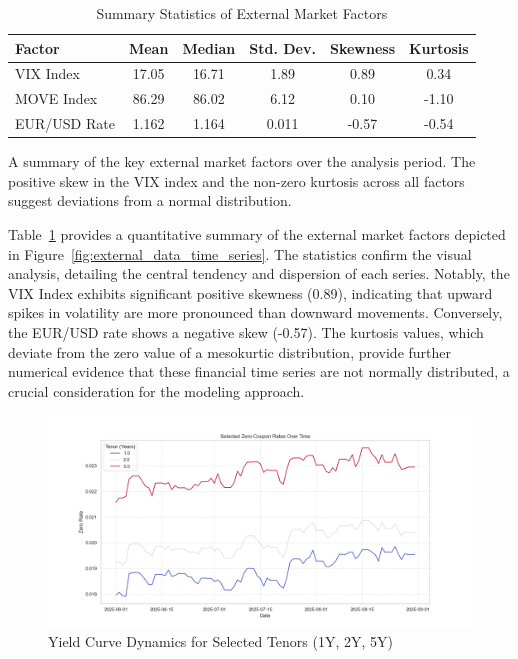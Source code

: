 \begin{table}[H]
	\centering
	\begin{threeparttable}
		\caption{Summary Statistics of External Market Factors}
		\label{tab:external_summary}
		\begin{tabular}{lccccc}
			\toprule
			\textbf{Factor} & \textbf{Mean} & \textbf{Median} & \textbf{Std. Dev.} & \textbf{Skewness} & \textbf{Kurtosis} \\
			\midrule
			VIX Index       & 17.05         & 16.71           & 1.89               & 0.89              & 0.34              \\
			MOVE Index      & 86.29         & 86.02           & 6.12               & 0.10              & -1.10             \\
			EUR/USD Rate    & 1.162         & 1.164           & 0.011              & -0.57             & -0.54             \\
			\bottomrule
		\end{tabular}
		\begin{tablenotes}
			\footnotesize
			\item  A summary of the key external market factors over the analysis period. The positive skew in the VIX index and the non-zero kurtosis across all factors suggest deviations from a normal distribution.
		\end{tablenotes}
	\end{threeparttable}
\end{table}


Table~\ref{tab:external_summary} provides a quantitative summary of the external market factors depicted in Figure~\ref{fig:external_data_time_series}. The statistics confirm the visual analysis, detailing the central tendency and dispersion of each series. Notably, the VIX Index exhibits significant positive skewness (0.89), indicating that upward spikes in volatility are more pronounced than downward movements. Conversely, the EUR/USD rate shows a negative skew (-0.57). The kurtosis values, which deviate from the zero value of a mesokurtic distribution, provide further numerical evidence that these financial time series are not normally distributed, a crucial consideration for the modeling approach.

\begin{figure}[H]
	\centering
	\includegraphics[width=1\textwidth]{images/descriptive_data_analysis/yield_curve_selected_tenors.png}
	\caption{Yield Curve Dynamics for Selected Tenors (1Y, 2Y, 5Y)}
	\label{fig:yield_curve_selected_tenors}
\end{figure}

